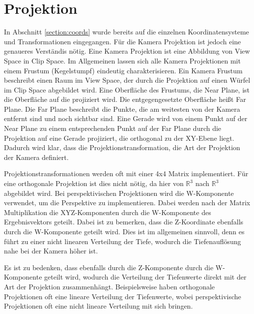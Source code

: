 \section{Projektion}
In Abschnitt \ref{section:coords} wurde bereits auf die einzelnen Koordinatensysteme und Transformationen eingegangen.
Für die Kamera Projektion ist jedoch eine genaueres Verständis nötig.
Eine Kamera Projektion ist eine Abbildung von View Space in Clip Space.
Im Allgemeinen lassen sich alle Kamera Projektionen mit einem Frustum (Kegelstumpf) eindeutig charakterisieren.
Ein Kamera Frustum beschreibt einen Raum im View Space, 
der durch die Projektion auf einen Würfel im Clip Space abgebildet wird.
Eine Oberfläche des Frustums, die Near Plane, ist die Oberfläche auf die projiziert wird.
Die entgegengesetzte Oberfläche heißt Far Plane. 
Die Far Plane beschreibt die Punkte, die am weitesten von der Kamera entfernt sind und noch sichtbar sind.
Eine Gerade wird von einem Punkt auf der Near Plane zu einem entsprechenden Punkt auf der Far Plane
durch die Projektion auf eine Gerade projiziert, die orthogonal zu der XY-Ebene liegt.
Dadurch wird klar, dass die Projektionstransformation, die Art der Projektion der Kamera definiert.
\par
Projektionstransformationen werden oft mit einer 4x4 Matrix implementiert.
Für eine orthogonale Projektion ist dies nicht nötig, da hier von $\mathbb{R}^3$ nach $\mathbb{R}^3$ abgebildet wird.
Bei perspektivischen Projektionen wird die W-Komponente verwendet, um die Perspektive zu implementieren.
Dabei werden nach der Matrix Multiplikation die XYZ-Komponenten durch die W-Komponente des Ergebnisvektors geteilt.
Dabei ist zu bemerken, dass die Z-Koordinate ebenfalls durch die W-Komponente geteilt wird. 
Dies ist im allgemeinen sinnvoll, denn es führt zu einer nicht linearen Verteilung der Tiefe, wodurch die Tiefenauflösung
nahe bei der Kamera höher ist.
\par
Es ist zu bedenken, dass ebenfalls durch die Z-Komponente durch die W-Komponente geteilt wird, wodurch die Verteilung der Tiefenwerte direkt mit der 
Art der Projektion zusammenhängt. Beispielsweise haben orthogonale Projektionen oft eine lineare Verteilung der Tiefenwerte,
wobei perspektivische Projektionen oft eine nicht lineare Verteilung mit sich bringen.

